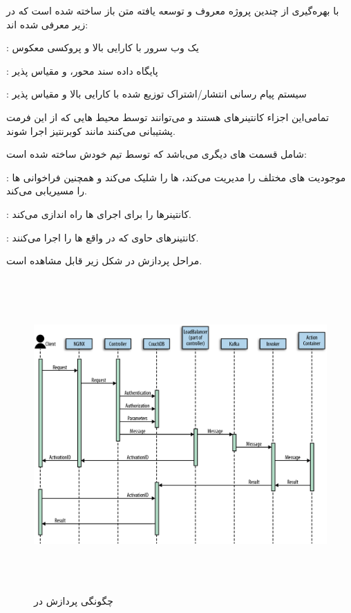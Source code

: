  با بهره‌گیری از چندین پروژه معروف و توسعه یافته متن باز ساخته شده است که در زیر معرفی شده اند:

\textbf{} : یک وب سرور با کارایی بالا و پروکسی معکوس

\textbf{} : پایگاه داده سند محور،  و مقیاس پذیر

\textbf{} : سیستم پیام رسانی انتشار/اشتراک توزیع شده با کارایی بالا و مقیاس پذیر

تمامی‌این اجزاء کانتینرهای  هستند و می‌توانند توسط محیط هایی که از این فرمت پشتیبانی می‌کنند مانند کوبرنتیز اجرا شوند.

 شامل قسمت های دیگری می‌باشد که توسط تیم خودش ساخته شده است:

\textbf{} : موجودیت های مختلف را مدیریت می‌کند،  ها را شلیک می‌کند و همچنین فراخوانی  ها را مسیریابی می‌کند.

\textbf{} : کانتینرها را برای اجرای  ها راه اندازی می‌کند.

\textbf{} : کانتینرهای حاوی  که در واقع  ها را اجرا می‌کنند.

مراحل پردازش  در شکل زیر قابل مشاهده است.

\begin{figure}[!h]
	\centering
	\includegraphics[height=12cm]{images/action_invokation_timeline}
	\caption{چگونگی پردازش  در }
	\label{تصویر 2-1}
\end{figure}

